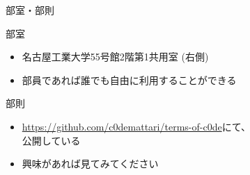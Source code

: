\documentclass[12pt, unicode]{beamer}
\begin{document}
\begin{frame}{部室・部則}
    \begin{block}{部室}
        \begin{itemize}
            \item 名古屋工業大学55号館2階第1共用室 (右側)
            \item 部員であれば誰でも自由に利用することができる
        \end{itemize}
    \end{block}

    \begin{block}{部則}
        \begin{itemize}
            \item \textcolor{blue}{\url{https://github.com/c0demattari/terms-of-c0de}}にて、\\ 公開している
            \item 興味があれば見てみてください
        \end{itemize}
    \end{block}
\end{frame}
\end{document}

